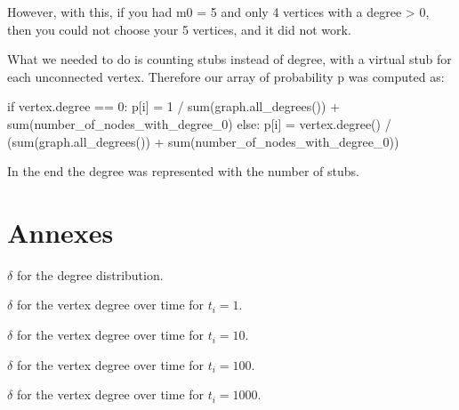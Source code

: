 \documentclass{article}
\begin{document}
However, with this, if you had m0 = 5 and only 4 vertices with a degree > 0,
then you could not choose your 5 vertices, and it did not work.

What we needed to do is counting stubs instead of degree, with a virtual stub
for each unconnected vertex. Therefore our array of probability p was computed
as:

\begin{python}
if vertex.degree == 0:
    p[i] = 1 / sum(graph.all_degrees()) + sum(number_of_nodes_with_degree_0)
else:
    p[i] = vertex.degree() / (sum(graph.all_degrees()) + sum(number_of_nodes_with_degree_0))
\end{python}

In the end the degree was represented with the number of stubs.


\section*{Annexes}


\begin{table}[H]
	\centering
	
	\caption{$\delta$ for the degree distribution.}
	\label{tab:AICdd}
\end{table}
\begin{table}[H]
	\centering
	
	\caption{$\delta$ for the vertex degree over time for $t_i = 1$.}
	\label{tab:AICdt1}
\end{table}
\begin{table}[H]
	\centering
	
	\caption{$\delta$ for the vertex degree over time for $t_i = 10$.}
	\label{tab:AICdt10}
\end{table}
\begin{table}[H]
	\centering
	
	\caption{$\delta$ for the vertex degree over time for $t_i = 100$.}
	\label{tab:AICdt100}
\end{table}
\begin{table}[H]
	\centering
	
	\caption{$\delta$ for the vertex degree over time for $t_i = 1000$.}
	\label{tab:AICdt1000}
\end{table}
\end{document}
